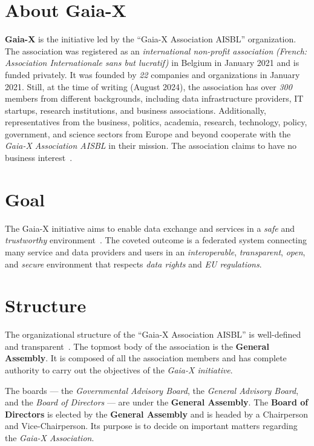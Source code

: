 \section{About Gaia-X}\label{sec:about-gaia-x}

\textbf{Gaia-X} is the initiative led by the ``Gaia-X Association AISBL'' organization.
The association was registered as an \textit{international non-profit association} \textit{(French: Association Internationale sans but lucratif)} in Belgium in January 2021 and is funded privately.
It was founded by \textit{22} companies and organizations in January 2021.
Still, at the time of writing (August 2024), the association has over \textit{300} members from different backgrounds, including data infrastructure providers, IT startups, research institutions, and business associations.
Additionally, representatives from the business, politics, academia, research, technology, policy, government, and science sectors from Europe and beyond cooperate with the \textit{Gaia-X Association AISBL} in their mission.
The association claims to have no business interest~\cite{gaiax}.

\section{Goal}\label{sec:gaia-x-goal}

The Gaia-X initiative aims to enable data exchange and services in a \textit{safe} and \textit{trustworthy} environment~\cite{gaiax}.
The coveted outcome is a federated system connecting many service and data providers and users in an \textit{interoperable}, \textit{transparent}, \textit{open}, and \textit{secure} environment that respects \textit{data rights} and \textit{EU regulations}.

\section{Structure}\label{sec:the-structure}

The organizational structure of the ``Gaia-X Association AISBL'' is well-defined and transparent~\cite{gaiax}.
The topmost body of the association is the \textbf{General Assembly}.
It is composed of all the association members and has complete authority to carry out the objectives of the \textit{Gaia-X initiative}.

The boards --- the \textit{Governmental Advisory Board}, the \textit{General Advisory Board}, and the \textit{Board of Directors} --- are under the \textbf{General Assembly}.
The \textbf{Board of Directors} is elected by the \textbf{General Assembly} and is headed by a Chairperson and Vice-Chairperson.
Its purpose is to decide on important matters regarding the \textit{Gaia-X Association}.

